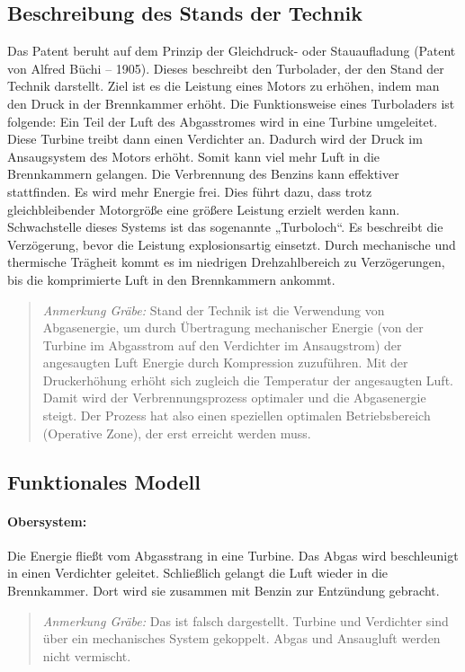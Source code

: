\documentclass[11pt,a4paper]{article}
\newcommand{\HGG}[1]{\begin{quote} \emph{Anmerkung Gräbe:} #1  \end{quote}}
\begin{document}
\subsection{Beschreibung des Stands der Technik}
Das Patent beruht auf dem Prinzip der Gleichdruck- oder Stauaufladung (Patent
von Alfred Büchi -- 1905).  Dieses beschreibt den Turbolader, der den Stand
der Technik darstellt.  Ziel ist es die Leistung eines Motors zu erhöhen,
indem man den Druck in der Brennkammer erhöht.  Die Funktionsweise eines
Turboladers ist folgende: Ein Teil der Luft des Abgasstromes wird in eine
Turbine umgeleitet. Diese Turbine treibt dann einen Verdichter an. Dadurch
wird der Druck im Ansaugsystem des Motors erhöht. Somit kann viel mehr Luft in
die Brennkammern gelangen.  Die Verbrennung des Benzins kann effektiver
stattfinden. Es wird mehr Energie frei.  Dies führt dazu, dass trotz
gleichbleibender Motorgröße eine größere Leistung erzielt werden kann.
Schwachstelle dieses Systems ist das sogenannte „Turboloch“. Es beschreibt die
Verzögerung, bevor die Leistung explosionsartig einsetzt. Durch mechanische
und thermische Trägheit kommt es im niedrigen Drehzahlbereich zu
Verzögerungen, bis die komprimierte Luft in den Brennkammern ankommt.

\HGG{Stand der Technik ist die Verwendung von Abgasenergie, um durch
  Übertragung mechanischer Energie (von der Turbine im Abgasstrom auf den
  Verdichter im Ansaugstrom) der angesaugten Luft Energie durch Kompression
  zuzuführen.  Mit der Druckerhöhung erhöht sich zugleich die Temperatur der
  angesaugten Luft. Damit wird der Verbrennungsprozess optimaler und die
  Abgasenergie steigt. Der Prozess hat also einen speziellen optimalen
  Betriebsbereich (Operative Zone), der erst erreicht werden muss. }

\subsection{Funktionales Modell}
\paragraph{Obersystem:}
Die Energie fließt vom Abgasstrang in eine Turbine. Das Abgas wird
beschleunigt in einen Verdichter geleitet. Schließlich gelangt die Luft wieder
in die Brennkammer. Dort wird sie zusammen mit Benzin zur Entzündung gebracht.

\HGG{Das ist falsch dargestellt. Turbine und Verdichter sind über ein
  mechanisches System gekoppelt. Abgas und Ansaugluft werden nicht
  vermischt. }
\end{document}
